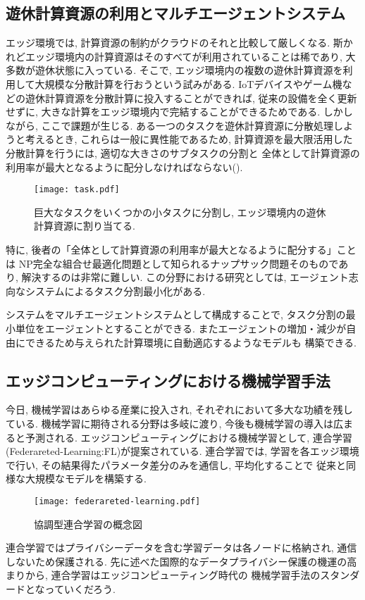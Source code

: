 \subsection*{遊休計算資源の利用とマルチエージェントシステム}
エッジ環境では, 計算資源の制約がクラウドのそれと比較して厳しくなる.
斯かれどエッジ環境内の計算資源はそのすべてが利用されていることは稀であり, 
大多数が遊休状態に入っている.
そこで, エッジ環境内の複数の遊休計算資源を利用して大規模な分散計算を行おうという試みがある.
IoTデバイスやゲーム機などの遊休計算資源を分散計算に投入することができれば, 
従来の設備を全く更新せずに, 大きな計算をエッジ環境内で完結することができるためである.
しかしながら, ここで課題が生じる.
ある一つのタスクを遊休計算資源に分散処理しようと考えるとき, これらは一般に異性能であるため,  
計算資源を最大限活用した分散計算を行うには, 適切な大きさのサブタスクの分割と
全体として計算資源の利用率が最大となるように配分しなければならない().
\begin{figure}[H]
  \centering
  \texttt{[image: task.pdf]}
  \caption{巨大なタスクをいくつかの小タスクに分割し, エッジ環境内の遊休計算資源に割り当てる.}
  \label{fig:task}
\end{figure}
特に, 後者の「全体として計算資源の利用率が最大となるように配分する」ことは
NP完全な組合せ最適化問題として知られるナップサック問題そのものであり, 
解決するのは非常に難しい. 
この分野における研究としては, 
エージェント志向なシステムによるタスク分割最小化がある.

システムをマルチエージェントシステムとして構成することで, 
タスク分割の最小単位をエージェントとすることができる. 
またエージェントの増加・減少が自由にできるため与えられた計算環境に自動適応するようなモデルも
構築できる.
\subsection*{エッジコンピューティングにおける機械学習手法}
今日, 機械学習はあらゆる産業に投入され, それぞれにおいて多大な功績を残している.
機械学習に期待される分野は多岐に渡り, 今後も機械学習の導入は広まると予測される. 
エッジコンピューティングにおける機械学習として, 連合学習(Federareted-Learning:FL)が提案されている. 
連合学習では, 学習を各エッジ環境で行い, その結果得たパラメータ差分のみを通信し, 平均化することで
従来と同様な大規模なモデルを構築する.
\begin{figure}[H]
  \centering
  \texttt{[image: federareted-learning.pdf]}
  \caption{協調型連合学習の概念図}
\end{figure}
連合学習ではプライバシーデータを含む学習データは各ノードに格納され, 
通信しないため保護される.
先に述べた国際的なデータプライバシー保護の機運の高まりから, 連合学習はエッジコンピューティング時代の
機械学習手法のスタンダードとなっていくだろう.
